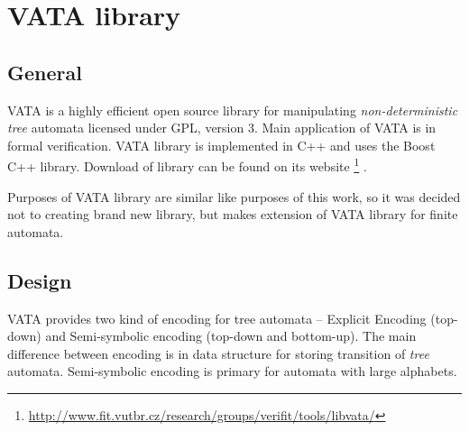 \section{VATA library}
\label{VATA}
\subsection{General}
VATA is a highly efficient open source library for manipulating \emph{non-deterministic tree} automata licensed under GPL, version 3. 
Main application of VATA is in formal verification.
VATA library is implemented in C++ and uses the Boost C++ library. Download of library can be found on its website 
\footnote{\url{http://www.fit.vutbr.cz/research/groups/verifit/tools/libvata/}} \cite{libvata}.  

Purposes of VATA library are similar like purposes of this work, so it was decided not to creating brand new library, but makes extension of VATA library
for finite automata.

\subsection{Design}
\label{sectionDesignVata}
VATA provides two kind of encoding for tree automata -- Explicit Encoding (top-down) and Semi-symbolic encoding (top-down and bottom-up). The main difference
between encoding is
in data structure for storing transition of \emph{tree} automata. Semi-symbolic encoding is primary for automata with large alphabets. 

